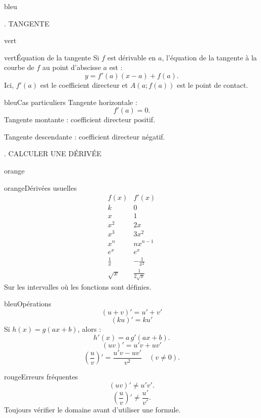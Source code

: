 \documentclass[11pt,a4paper]{article}
\newcommand{\tagcol}[2]{\begin{tcolorbox}[enhanced,colback=#1!11,colframe=#1!45!black,boxrule=0.42pt,arc=2mm,left=1mm,right=1mm,top=0.45mm,bottom=0.45mm,before skip=0mm,after skip=0.85mm,fontupper=\bfseries\scriptsize,colupper=#1!55!black]\centering #2\end{tcolorbox}}
\begin{document}
\begin{landscape}
\begin{minipage}[t]{0.242\linewidth}
\begin{panel}{bleu}
\end{panel}
\end{minipage}\hfill
\begin{minipage}[t]{0.242\linewidth}
\tagcol{vert}{2. TANGENTE}
\begin{panel}{vert}

\begin{fichebox}{vert}{Équation de la tangente}
Si $f$ est dérivable en $a$, l'équation de la tangente à la courbe de $f$ au point d'abscisse $a$ est :
\[
 y=f'(a)(x-a)+f(a).
\]
Ici, $f'(a)$ est le coefficient directeur et $A(a;f(a))$ est le point de contact.
\end{fichebox}

\begin{fichebox}{bleu}{Cas particuliers}
Tangente horizontale :
\[
 f'(a)=0.
\]
Tangente montante : coefficient directeur positif.

Tangente descendante : coefficient directeur négatif.
\end{fichebox}

\end{panel}
\end{minipage}\hfill
\begin{minipage}[t]{0.242\linewidth}
\tagcol{orange}{3. CALCULER UNE DÉRIVÉE}
\begin{panel}{orange}

\begin{fichebox}{orange}{Dérivées usuelles}
\[
\begin{array}{c|c}
f(x)&f'(x)\\ \hline
k&0\\
x&1\\
x^2&2x\\
x^3&3x^2\\
x^n&nx^{n-1}\\
e^x&e^x\\
\frac1x&-\frac1{x^2}\\
\sqrt{x}&\frac1{2\sqrt{x}}
\end{array}
\]
Sur les intervalles où les fonctions sont définies.
\end{fichebox}

\begin{fichebox}{bleu}{Opérations}
\[
(u+v)'=u'+v'
\]
\[
(ku)'=ku'
\]
Si $h(x)=g(ax+b)$, alors :
\[
h'(x)=a\,g'(ax+b).
\]
\[
(uv)'=u'v+uv'
\]
\[
\left(\frac{u}{v}\right)'=\frac{u'v-uv'}{v^2}
\quad (v\neq0).
\]
\end{fichebox}

\begin{fichebox}{rouge}{Erreurs fréquentes}
\[
(uv)'\neq u'v'.
\]
\[
\left(\frac{u}{v}\right)'\neq\frac{u'}{v'}.
\]
Toujours vérifier le domaine avant d'utiliser une formule.
\end{fichebox}


\end{panel}
\end{minipage}
\end{landscape}
\end{document}
